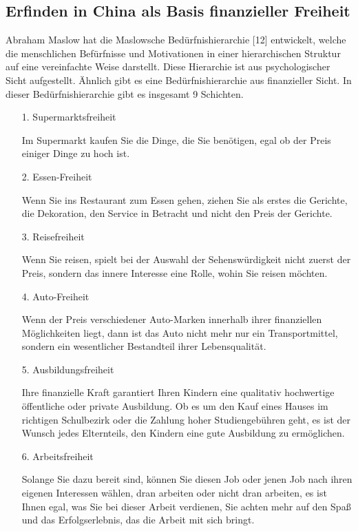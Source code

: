\documentclass[11pt,a4paper]{article}
\begin{document}
\subsection{Erfinden in China als Basis finanzieller Freiheit}

Abraham Maslow hat die Maslowsche Bedürfnishierarchie [12] entwickelt, welche
die menschlichen Befürfnisse und Motivationen in einer hierarchischen Struktur
auf eine vereinfachte Weise darstellt. Diese Hierarchie ist aus
psychologischer Sicht aufgestellt. Ähnlich gibt es eine Bedürfnishierarchie
aus finanzieller Sicht. In dieser Bedürfnishierarchie gibt es insgesamt 9
Schichten.
\begin{itemize}
\item[1.] Supermarktsfreiheit

Im Supermarkt kaufen Sie die Dinge, die Sie benötigen, egal ob der Preis
einiger Dinge zu hoch ist.

\item[2.] Essen-Freiheit

Wenn Sie ins Restaurant zum Essen gehen, ziehen Sie als erstes die Gerichte,
die Dekoration, den Service in Betracht und nicht den Preis der Gerichte.

\item[3.] Reisefreiheit

Wenn Sie reisen, spielt bei der Auswahl der Sehenswürdigkeit nicht zuerst der
Preis, sondern das innere Interesse eine Rolle, wohin Sie reisen möchten.

\item[4.] Auto-Freiheit

Wenn der Preis verschiedener Auto-Marken innerhalb ihrer finanziellen
Möglichkeiten liegt, dann ist das Auto nicht mehr nur ein Transportmittel,
sondern ein wesentlicher Bestandteil ihrer Lebensqualität.

\item[5.] Ausbildungsfreiheit

Ihre finanzielle Kraft garantiert Ihren Kindern eine qualitativ hochwertige
öffentliche oder private Ausbildung. Ob es um den Kauf eines Hauses im
richtigen Schulbezirk oder die Zahlung hoher Studiengebühren geht, es ist der
Wunsch jedes Elternteils, den Kindern eine gute Ausbildung zu ermöglichen.

\item[6.] Arbeitsfreiheit

Solange Sie dazu bereit sind, können Sie diesen Job oder jenen Job nach ihren
eigenen Interessen wählen, dran arbeiten oder nicht dran arbeiten, es ist
Ihnen egal, was Sie bei dieser Arbeit verdienen, Sie achten mehr auf den Spaß
und das Erfolgserlebnis, das die Arbeit mit sich bringt.


\end{itemize}
\end{document}
